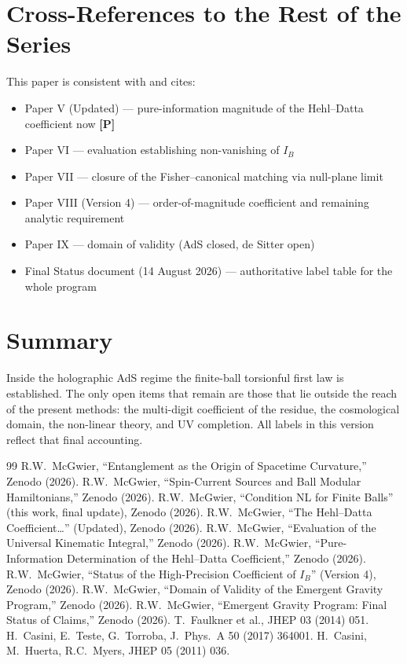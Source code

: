 \documentclass[11pt]{article}
\newcommand{\pP}{\textbf{[P]}}
\begin{document}
\section{Cross-References to the Rest of the Series}
This paper is consistent with and cites:
\begin{itemize}[leftmargin=1.4em]
\item Paper V (Updated) --- pure-information magnitude of the Hehl--Datta coefficient now \pP{}
\item Paper VI --- evaluation establishing non-vanishing of $I_B$
\item Paper VII --- closure of the Fisher--canonical matching via null-plane limit
\item Paper VIII (Version 4) --- order-of-magnitude coefficient and remaining analytic requirement
\item Paper IX --- domain of validity (AdS closed, de Sitter open)
\item Final Status document (14 August 2026) --- authoritative label table for the whole program
\end{itemize}

\section{Summary}
Inside the holographic AdS regime the finite-ball torsionful first law is
established. The only open items that remain are those that lie outside
the reach of the present methods: the multi-digit coefficient of the
residue, the cosmological domain, the non-linear theory, and UV
completion. All labels in this version reflect that final accounting.

\begin{thebibliography}{99}
 R.W.\ McGwier, ``Entanglement as the Origin of Spacetime Curvature,'' Zenodo (2026).
 R.W.\ McGwier, ``Spin-Current Sources and Ball Modular Hamiltonians,'' Zenodo (2026).
 R.W.\ McGwier, ``Condition NL for Finite Balls'' (this work, final update), Zenodo (2026).
 R.W.\ McGwier, ``The Hehl--Datta Coefficient\ldots'' (Updated), Zenodo (2026).
 R.W.\ McGwier, ``Evaluation of the Universal Kinematic Integral,'' Zenodo (2026).
 R.W.\ McGwier, ``Pure-Information Determination of the Hehl--Datta Coefficient,'' Zenodo (2026).
 R.W.\ McGwier, ``Status of the High-Precision Coefficient of $I_B$'' (Version 4), Zenodo (2026).
 R.W.\ McGwier, ``Domain of Validity of the Emergent Gravity Program,'' Zenodo (2026).
 R.W.\ McGwier, ``Emergent Gravity Program: Final Status of Claims,'' Zenodo (2026).
 T.\ Faulkner et al., JHEP 03 (2014) 051.
 H.\ Casini, E.\ Teste, G.\ Torroba, J.\ Phys.\ A 50 (2017) 364001.
 H.\ Casini, M.\ Huerta, R.C.\ Myers, JHEP 05 (2011) 036.
\end{thebibliography}
\end{document}
